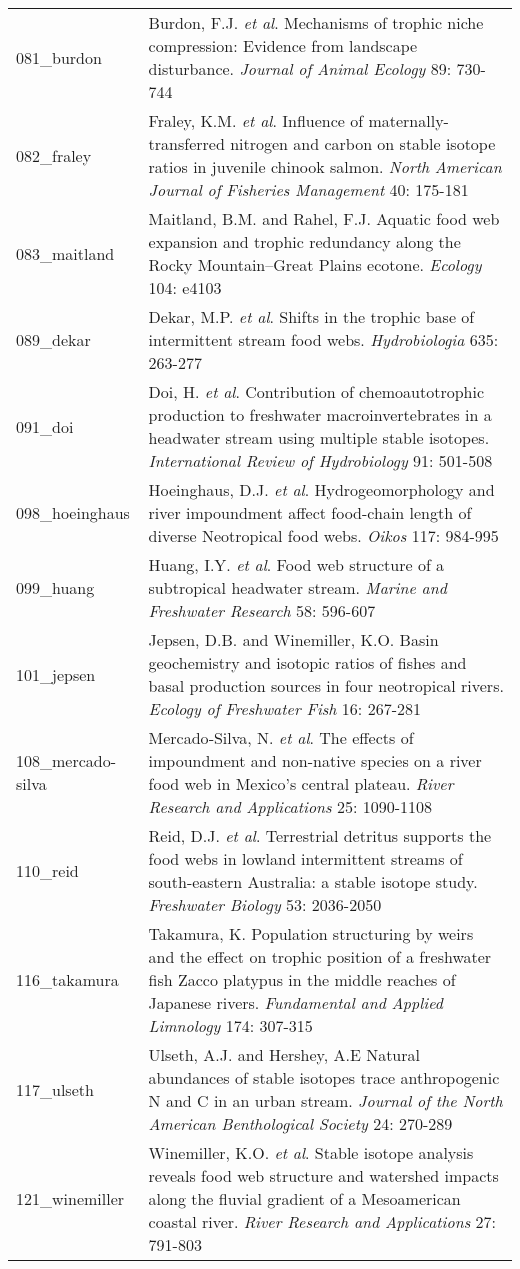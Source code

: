 \begin{longtable}{p{}p{}}
  081_burdon & Burdon, F.J. \textit{et al}. Mechanisms of trophic niche compression: Evidence from landscape disturbance. \textit{Journal of Animal Ecology} 89: 730-744 \\ 
  082_fraley & Fraley, K.M. \textit{et al}. Influence of maternally-transferred nitrogen and carbon on stable isotope ratios in juvenile chinook salmon. \textit{North American Journal of Fisheries Management} 40: 175-181 \\ 
  083_maitland & Maitland, B.M. and Rahel, F.J. Aquatic food web expansion and trophic redundancy along the Rocky Mountain–Great Plains ecotone. \textit{Ecology} 104: e4103 \\ 
  089_dekar & Dekar, M.P. \textit{et al}. Shifts in the trophic base of intermittent stream food webs. \textit{Hydrobiologia} 635: 263-277 \\ 
  091_doi & Doi, H. \textit{et al}. Contribution of chemoautotrophic production to freshwater macroinvertebrates in a headwater stream using multiple stable isotopes. \textit{International Review of Hydrobiology} 91: 501-508 \\ 
  098_hoeinghaus & Hoeinghaus, D.J. \textit{et al}. Hydrogeomorphology and river impoundment affect food-chain length of diverse Neotropical food webs. \textit{Oikos} 117: 984-995 \\ 
  099_huang & Huang, I.Y. \textit{et al}. Food web structure of a subtropical headwater stream. \textit{Marine and Freshwater Research} 58: 596-607 \\ 
  101_jepsen & Jepsen, D.B. and Winemiller, K.O. Basin geochemistry and isotopic ratios of fishes and basal production sources in four neotropical rivers. \textit{Ecology of Freshwater Fish} 16: 267-281 \\ 
  108_mercado-silva & Mercado‐Silva, N. \textit{et al}. The effects of impoundment and non-native species on a river food web in Mexico's central plateau. \textit{River Research and Applications} 25: 1090-1108 \\ 
  110_reid & Reid, D.J. \textit{et al}. Terrestrial detritus supports the food webs in lowland intermittent streams of south-eastern Australia: a stable isotope study. \textit{Freshwater Biology} 53: 2036-2050 \\ 
  116_takamura & Takamura, K. Population structuring by weirs and the effect on trophic position of a freshwater fish Zacco platypus in the middle reaches of Japanese rivers. \textit{Fundamental and Applied Limnology} 174: 307-315 \\ 
  117_ulseth & Ulseth, A.J. and Hershey, A.E Natural abundances of stable isotopes trace anthropogenic N and C in an urban stream. \textit{Journal of the North American Benthological Society} 24: 270-289 \\ 
  121_winemiller & Winemiller, K.O. \textit{et al}. Stable isotope analysis reveals food web structure and watershed impacts along the fluvial gradient of a Mesoamerican coastal river. \textit{River Research and Applications} 27: 791-803 \\ 
   \hline
\hline
\end{longtable}
\endgroup
